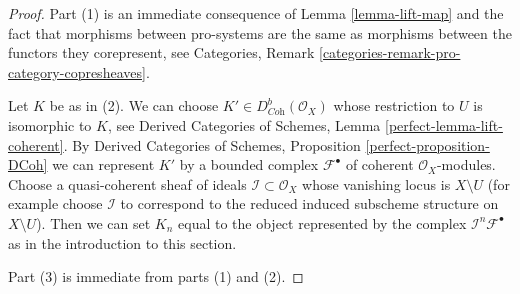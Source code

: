 \documentclass[10pt,a4paper]{amsart}
\theoremstyle{plain}
\theoremstyle{definition}
\theoremstyle{remark}
\numberwithin{equation}{subsection}
\begin{document}
\begin{proof}
Part (1) is an immediate consequence of Lemma \ref{lemma-lift-map}
and the fact that morphisms between pro-systems are
the same as morphisms between the functors they corepresent, see
Categories, Remark \ref{categories-remark-pro-category-copresheaves}.

\medskip\noindent
Let $K$ be as in (2). We can choose $K' \in D^b_{\textit{Coh}}(\mathcal{O}_X)$
whose restriction to $U$ is isomorphic to $K$, see
Derived Categories of Schemes, Lemma \ref{perfect-lemma-lift-coherent}.
By Derived Categories of Schemes, Proposition \ref{perfect-proposition-DCoh}
we can represent $K'$ by a bounded complex $\mathcal{F}^\bullet$
of coherent $\mathcal{O}_X$-modules. Choose a quasi-coherent sheaf
of ideals $\mathcal{I} \subset \mathcal{O}_X$ whose vanishing
locus is $X \setminus U$ (for example choose $\mathcal{I}$ to correspond
to the reduced induced subscheme structure on $X \setminus U$).
Then we can set $K_n$ equal to the object represented by the complex
$\mathcal{I}^n\mathcal{F}^\bullet$ as in the introduction
to this section.

\medskip\noindent
Part (3) is immediate from parts (1) and (2).
\end{proof}
\end{document}

